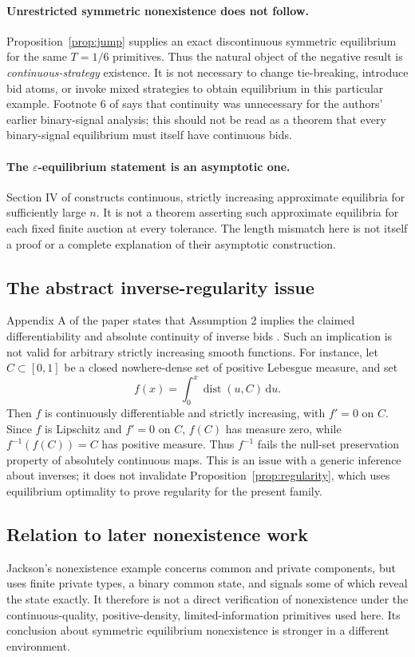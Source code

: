 \documentclass[11pt,a4paper]{article}
\numberwithin{equation}{section}
\theoremstyle{definition}
\theoremstyle{remark}
\newcommand{\dd}{\,\mathrm d}
\begin{document}
\paragraph{Unrestricted symmetric nonexistence does not follow.}
Proposition~\ref{prop:jump} supplies an exact discontinuous symmetric equilibrium for the same $T=1/6$ primitives. Thus the natural object of the negative result is \emph{continuous-strategy} existence. It is not necessary to change tie-breaking, introduce bid atoms, or invoke mixed strategies to obtain equilibrium in this particular example. Footnote 6 of \cite[p.~503]{PS2000} says that continuity was unnecessary for the authors' earlier binary-signal analysis; this should not be read as a theorem that every binary-signal equilibrium must itself have continuous bids.

\paragraph{The $\varepsilon$-equilibrium statement is an asymptotic one.}
Section IV of \cite[pp.~510--511]{PS2000} constructs continuous, strictly increasing approximate equilibria for sufficiently large $n$. It is not a theorem asserting such approximate equilibria for each fixed finite auction at every tolerance. The length mismatch here is not itself a proof or a complete explanation of their asymptotic construction.

\subsection{The abstract inverse-regularity issue}
Appendix A of the paper states that Assumption 2 implies the claimed differentiability and absolute continuity of inverse bids \cite[p.~513]{PS2000}. Such an implication is not valid for arbitrary strictly increasing smooth functions. For instance, let $C\subset[0,1]$ be a closed nowhere-dense set of positive Lebesgue measure, and set
\[
 f(x)=\int_0^x\operatorname{dist}(u,C)\dd u.
\]
Then $f$ is continuously differentiable and strictly increasing, with $f'=0$ on $C$. Since $f$ is Lipschitz and $f'=0$ on $C$, $f(C)$ has measure zero, while $f^{-1}(f(C))=C$ has positive measure. Thus $f^{-1}$ fails the null-set preservation property of absolutely continuous maps. This is an issue with a generic inference about inverses; it does not invalidate Proposition~\ref{prop:regularity}, which uses equilibrium optimality to prove regularity for the present family.

\subsection{Relation to later nonexistence work}
Jackson's nonexistence example \cite{Jackson2009} concerns common and private components, but uses finite private types, a binary common state, and signals some of which reveal the state exactly. It therefore is not a direct verification of nonexistence under the continuous-quality, positive-density, limited-information primitives used here. Its conclusion about symmetric equilibrium nonexistence is stronger in a different environment.
\end{document}
